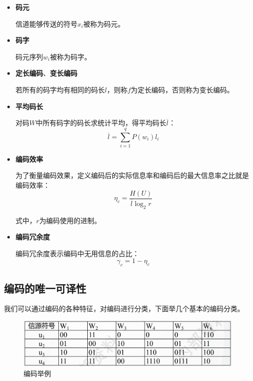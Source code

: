 \documentclass[UTF8,a4paper,11pt]{article}
\begin{document}
\begin{itemize}
\item \textbf{码元}

信道能够传送的符号$x_i$被称为码元。

\item \textbf{码字}

码元序列$w_i$被称为码字。

\item \textbf{定长编码}、\textbf{变长编码}

若所有的码字均有相同的码长$l$，则称$f$为定长编码，否则称为变长编码。

\item \textbf{平均码长}

对码$W$中所有码字的码长求统计平均，得平均码长$\overline{l}$：
\begin{equation}
\overline{l}=\sum_{i=1}^q P(w_i)l_i
\end{equation}

\item \textbf{编码效率}

为了衡量编码效果，定义编码后的实际信息率和编码后的最大信息率之比就是编码效率：
\begin{equation}
\eta_c=\frac{H(U)}{\overline{l}\log_{2}{r}}
\end{equation}

式中，$r$为编码使用的进制。

\item \textbf{编码冗余度}

编码冗余度表示编码中无用信息的占比：
\begin{equation}
\gamma_c=1-\eta_c
\end{equation}
\end{itemize}

\subsection{编码的唯一可译性}
我们可以通过编码的各种特征，对编码进行分类，下面举几个基本的编码分类。
\begin{figure}[htbp]
\centering
\includegraphics[scale=0.45]{p6.png}
\caption{编码举例}
\end{figure}
\end{document}
